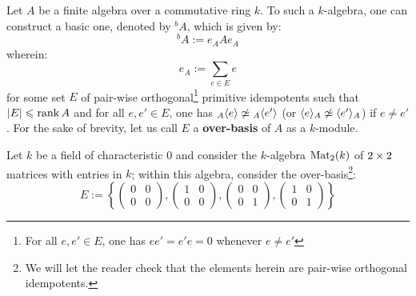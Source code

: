             \begin{definition} \label{def: associative_basic_algebras}
                Let $A$ be a finite algebra over a commutative ring $k$. To such a $k$-algebra, one can construct a basic one, denoted by ${}^bA$, which is given by:
                    $${}^bA := e_A A e_A$$
                wherein:
                    $$e_A := \sum_{e \in E} e$$
                for some set $E$ of pair-wise orthogonal\footnote{For all $e, e' \in E$, one has $ee' = e'e = 0$ whenever $e \not = e'$} primitive idempotents such that $|E| \leqslant \operatorname{rank} A$ and for all $e, e' \in E$, one has ${}_A\langle e\rangle \not \simeq {}_A\langle e'\rangle$ (or $\langle e\rangle_A \not \simeq \langle e'\rangle_A$) if $e \not = e'$. For the sake of brevity, let us call $E$ a \textbf{over-basis} of $A$ as a $k$-module.
            \end{definition}
            \begin{example}
                Let $k$ be a field of characteristic $0$ and consider the $k$-algebra $\mathrm{Mat}_2(k)$ of $2 \x 2$ matrices with entries in $k$; within this algebra, consider the over-basis\footnote{We will let the reader check that the elements herein are pair-wise orthogonal idempotents.}:
                    $$E := \left\{ \begin{pmatrix} 0 & 0 \\ 0 & 0 \end{pmatrix}, \begin{pmatrix} 1 & 0 \\ 0 & 0 \end{pmatrix}, \begin{pmatrix} 0 & 0 \\ 0 & 1 \end{pmatrix}, \begin{pmatrix} 1 & 0 \\ 0 & 1 \end{pmatrix} \right\}$$
                
            \end{example}
            
